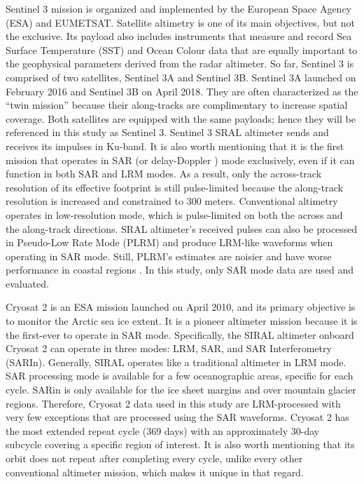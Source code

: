 Sentinel 3 mission is organized and implemented by the European Space Agency (ESA) and EUMETSAT. Satellite altimetry is one of its main objectives, but not the exclusive. Its payload also includes instruments that measure and record Sea Surface Temperature (SST) and Ocean Colour data that are equally important to the geophysical parameters derived from the radar altimeter. So far, Sentinel 3 is comprised of two satellites, Sentinel 3A and Sentinel 3B. Sentinel 3A launched on February 2016 and Sentinel 3B on April 2018. They are often characterized as the \enquote{twin mission} because their along-tracks are complimentary to increase spatial coverage. Both satellites are equipped with the same payloads; hence they will be referenced in this study as Sentinel 3. Sentinel 3 SRAL altimeter sends and receives its impulses in Ku-band. It is also worth mentioning that it is the first mission that operates in SAR (or delay-Doppler \cite{KeithRaney1998})  mode exclusively, even if it can function in both SAR and LRM modes. As a result, only the across-track resolution of its effective footprint is still pulse-limited because the along-track resolution is increased and constrained to 300 meters. Conventional altimetry operates in low-resolution mode, which is pulse-limited on both the across and the along-track directions. SRAL altimeter’s received pulses can also be processed in Pseudo-Low Rate Mode (PLRM) and produce LRM-like waveforms when operating in SAR mode. Still, PLRM's estimates are noisier and have worse performance in coastal regions \cite{Nencioli2019}. In this study, only SAR mode data are used and evaluated.

Cryosat 2 is an ESA mission launched on April 2010, and its primary objective is to monitor the Arctic sea ice extent. It is a pioneer altimeter mission because it is the first-ever to operate in SAR mode. Specifically, the SIRAL altimeter onboard Cryosat 2 can operate in three modes: LRM, SAR, and SAR Interferometry (SARIn). Generally, SIRAL operates like a traditional altimeter in LRM mode. SAR processing mode is available for a few oceanographic areas, specific for each cycle. SARin is only available for the ice sheet margins and over mountain glacier regions. Therefore, Cryosat 2 data used in this study are LRM-processed with very few exceptions that are processed using the SAR waveforms. Cryosat 2 has the most extended repeat cycle (369 days) with an approximately 30-day subcycle covering a specific region of interest. It is also worth mentioning that its orbit does not repeat after completing every cycle, unlike every other conventional altimeter mission, which makes it unique in that regard.

